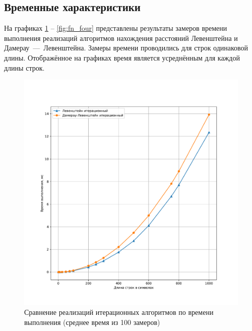 \newpage

\subsection{Временные характеристики}

На графиках \ref{fig:fn_iter} -- \ref{fig:fn_four} представлены результаты замеров времени выполнения реализаций алгоритмов нахождения расстояний Левенштейна и Дамерау~---~Левенштейна.
Замеры времени проводились для строк одинаковой длины.
Отображённое на графиках время является усреднённым для каждой длины строк.

\begin{figure}[H]
	\centering
	\includegraphics[width=\textwidth]{img/fn_iter.pdf}
	\caption{Сравнение реализаций итерационных алгоритмов по времени выполнения (среднее время из 100 замеров)}
	\label{fig:fn_iter}
\end{figure}

